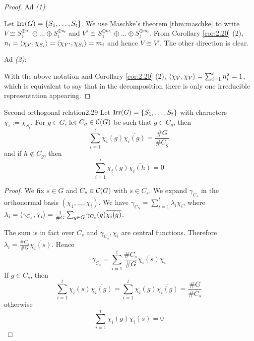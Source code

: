 \documentclass[twoside = false,	%
		headsepline,		%
		parskip = true,
		]{scrbook}						%
\begin{document}
    \begin{proof}
        Ad \textit{(1)}:
        
        Let $\mathrm{Irr}(G) = \{S_1,\dots,S_t\}$. We use Maschke's theorem \ref{thm:maschke} to write $V \cong S_1^{\oplus n_1} \oplus \dots \oplus S_t^{\oplus n_t}$ and $V' \cong S_1^{\oplus m_1} \oplus \dots \oplus S_t^{\oplus m_t}$. From Corollary \ref{cor:2.20} (2), $n_i = \left\langle \chi_V,\chi_{S_i}\right\rangle = \left\langle \chi_{V'},\chi_{S_i}\right\rangle = m_i$ and hence $V \cong V'$. The other direction is clear.

        Ad \textit{(2)}:
        
        With the above notation and Corollary \ref{cor:2.20} (2), $\left\langle \chi_V,\chi_V \right\rangle= \sum_{i=1}^t n_i^2 = 1$, which is equivalent to say that in the decomposition there is only one irreducible representation appearing.
    \end{proof}


    \begin{corollary}{Second orthogonal relation}{2.29}
        Let $\mathrm{Irr}(G) = \{S_1,\dots,S_t\}$ with characters $\chi_i := \chi_{S_i}$. For $g \in G$, let $C_g \in \mathcal C(G)$ be such that $g \in C_g$, then
        \begin{equation*}
            \sum_{i=1}^t \chi_i(g) \overline{\chi_i(g)} = \frac{\#G}{\#C_g}
        \end{equation*}
        and if $h \not \in C_g$, then
        \begin{equation*}
            \sum_{i=1}^t \chi_i(g) \overline{\chi_i(h)} = 0
        \end{equation*}
    \end{corollary}
    \begin{proof}
        We fix $s \in G$ and $C_s \in \mathcal C(G)$ with $s \in C_s$. We expand $\gamma_{C_s}$ in the orthonormal basis $(\chi_1,\dots,\chi_t)$. We have $\gamma_{C_S} = \sum_{i=1}^t \lambda_i \chi_i$, where $\lambda_i = \left\langle \gamma_{C_s},\chi_i\right\rangle = \frac{1}{\#G} \sum_{g \in G} \gamma_{C_s}(g) \overline{\chi_i(g)} $.

        The sum is in fact over $C_s$ and $\gamma_{C_s}, \chi_i$ are central functions. Therefore $\lambda_i  = \frac{\#C_s}{\#G}\overline{\chi_i(s)}$. Hence
        \begin{equation*}
            \gamma_{C_s} = \sum_{i=1}^t \frac{\#C_s}{\#G} \overline{\chi_i(s)} \chi_i
        \end{equation*}
        If $g \in C_s$, then
        \begin{equation*}
            \sum_{i=1}^t \chi_i(s) \overline{\chi_i(g)} = \sum_{i=1}^t \chi_i(g) \overline{\chi_i(g)} = \frac{\#G}{\#C_s}
        \end{equation*}
        otherwise
        \begin{equation*}
            \sum_{i=1}^t \chi_i(g) \overline{\chi_i(s)} = 0
        \end{equation*}
    \end{proof}
\end{document}

